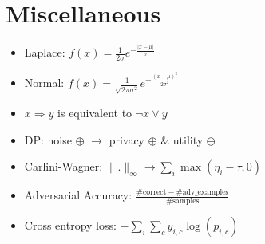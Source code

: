 \section{Miscellaneous}
\begin{itemize}
  \item Laplace: $f(x)=\frac{1}{2\sigma}e^{-\frac{|x-\mu|}{\sigma}}$
  \item Normal: $f(x)=\frac{1}{\sqrt{2\pi\sigma^2}}e^{-\frac{(x-\mu)^2}{2\sigma^2}}$
  \item $x\Rightarrow y$ is equivalent to $\neg x \lor y$
  \item DP: noise $\oplus$ $\rightarrow$ privacy $\oplus$ \& utility $\ominus$
  \item Carlini-Wagner: $\|.\|_{\infty}\rightarrow\sum_i \max(\eta_i-\tau,0)$
  \item Adversarial Accuracy: $\frac{\#\text{correct} - \#\text {adv\_examples}}{\#\text{samples}}$
  \item Cross entropy loss: $-\sum_i\sum_c y_{i,c}\log(p_{i,c})$
\end{itemize}
